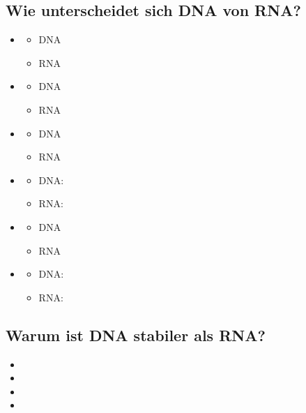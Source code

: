 \documentclass{article}
\begin{document}
\subsection*{Wie unterscheidet sich DNA von RNA?}
\begin{itemize}
    \item 
    \begin{itemize}
        \item DNA  
        \item RNA  
    \end{itemize}
    \item 
    \begin{itemize}
        \item DNA  
        \item RNA  
    \end{itemize}
    \item 
    \begin{itemize}
        \item DNA  
        \item RNA 
    \end{itemize}
    \item 
    \begin{itemize}
        \item DNA: 
        \item RNA: 
    \end{itemize}
    \item 
    \begin{itemize}
        \item DNA 
        \item RNA 
    \end{itemize}
    \item 
    \begin{itemize}
        \item DNA: 
        \item RNA: 
    \end{itemize}
\end{itemize}

\subsection*{Warum ist DNA stabiler als RNA?}

\begin{itemize}
    \item 
    \item 
    \item 
    \item 
\end{itemize}
\end{document}

